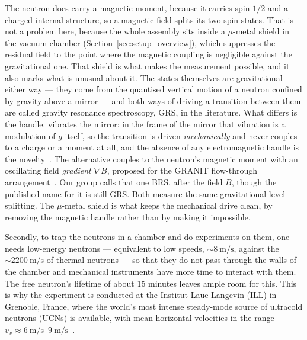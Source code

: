 \documentclass[a4paper,headsepline,oneside,11pt]{scrartcl}
\begin{document}
The neutron does carry a magnetic moment, because it carries spin $1/2$ and a
charged internal structure, so a magnetic field splits its two spin states.
That is not a problem here, because the
whole assembly sits inside a $\mu$-metal shield in the vacuum chamber
(Section~\ref{sec:setup_overview}), which suppresses the residual field to the
point where the magnetic coupling is negligible against the gravitational one.
That shield is what makes the measurement possible, and it also marks what is
unusual about it. The states themselves are gravitational either way --- they
come from the quantised vertical motion of a neutron confined by gravity above a
mirror --- and both ways of driving a transition between them are called gravity
resonance spectroscopy, GRS, in the literature. What differs is the handle.
\qbounce{} vibrates the mirror: in the frame of the mirror that vibration is a
modulation of $g$ itself, so the transition is driven \emph{mechanically} and
never couples to a charge or a moment at all, and the absence of any
electromagnetic handle is the novelty~\cite{Jenke2011, Cronenberg2012}. The
alternative couples to the neutron's magnetic moment with an oscillating field
\emph{gradient} $\nabla B$, proposed for the GRANIT flow-through
arrangement~\cite{Pignol2014}. Our group calls that one BRS, after the field
$B$, though the published name for it is still GRS. Both measure the same
gravitational level splitting. The $\mu$-metal shield is what keeps the
mechanical drive clean, by removing the magnetic handle rather than by making it
impossible.

Secondly, to trap the neutrons in a chamber and do experiments on them, one needs low-energy neutrons --- equivalent to low speeds, ${\sim}\SI{8}{\metre\per\second}$, against the ${\sim}\SI{2200}{\metre\per\second}$ of thermal neutrons --- so that they do not pass through the walls of the chamber and mechanical instruments have more time to interact with them. The free neutron's lifetime of about 15 minutes leaves ample room for this.
This is why the experiment is conducted at the Institut Laue-Langevin (ILL) in Grenoble, France, where the world's most intense steady-mode source of ultracold neutrons (UCNs) is available, with mean horizontal velocities in the range $v_x \approx \SIrange{6}{9}{\metre\per\second}$~\cite{Bosina2023}.
\end{document}
